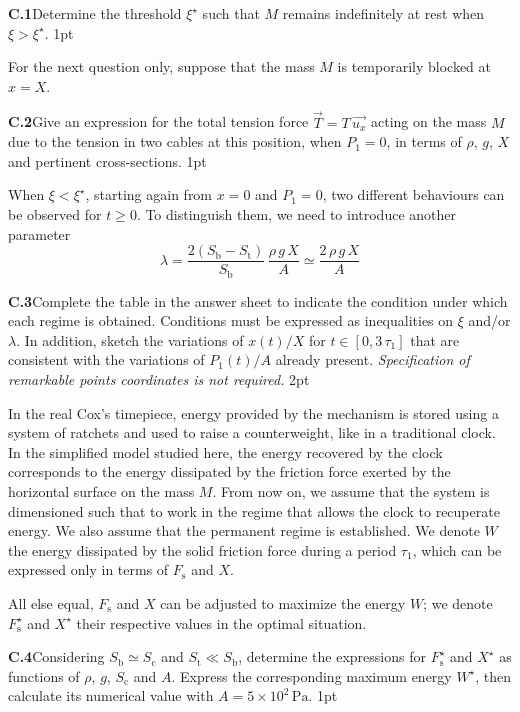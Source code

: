 \textbf{C.1}\quad Determine the threshold $\xi^\star$ such that $M$ remains
indefinitely at rest when $\xi > \xi^\star$. \hfill 1pt

For the next question only, suppose that the mass $M$ is temporarily blocked at
$x = X$.

\textbf{C.2}\quad Give an expression for the total tension force
$\overrightarrow{T} = T\,\overrightarrow{u_x}$ acting on the mass $M$ due to
the tension in two cables at this position, when $P_1 = 0$, in terms of $\rho$,
$g$, $X$ and pertinent cross-sections. \hfill 1pt

When $\xi < \xi^\star$, starting again from $x = 0$ and $P_1 = 0$, two different
behaviours can be observed for $t \geq 0$. To distinguish them, we need to
introduce another parameter
\begin{equation}
\lambda = \frac{2\left(S_\mathrm{b} - S_\mathrm{t}\right)}{S_\mathrm{b}}\,\frac{\rho\,g\,X}{A} \simeq \frac{2\,\rho\,g\,X}{A} \tag{4}
\end{equation}

\textbf{C.3}\quad Complete the table in the answer sheet to indicate the
condition under which each regime is obtained. Conditions must be expressed as
inequalities on $\xi$ and/or $\lambda$. In addition, sketch the variations of
$x(t)/X$ for $t \in \left[0, 3\,\tau_1\right]$ that are consistent with the
variations of $P_1(t)/A$ already present. \textit{Specification of remarkable
points coordinates is not required.} \hfill 2pt

In the real Cox's timepiece, energy provided by the mechanism is stored using a
system of ratchets and used to raise a counterweight, like in a traditional
clock. In the simplified model studied here, the energy recovered by the clock
corresponds to the energy dissipated by the friction force exerted by the
horizontal surface on the mass $M$. From now on, we assume that the system is
dimensioned such that to work in the regime that allows the clock to
recuperate energy. We also assume that the permanent regime is established. We
denote $W$ the energy dissipated by the solid friction force during a period
$\tau_1$, which can be expressed only in terms of $F_\mathrm{s}$ and $X$.

All else equal, $F_\mathrm{s}$ and $X$ can be adjusted to maximize the energy
$W$; we denote $F_\mathrm{s}^\star$ and $X^\star$ their respective values in
the optimal situation.

\textbf{C.4}\quad Considering $S_\mathrm{b} \simeq S_\mathrm{c}$ and
$S_\mathrm{t} \ll S_\mathrm{b}$, determine the expressions for
$F_\mathrm{s}^\star$ and $X^\star$ as functions of $\rho$, $g$, $S_\mathrm{c}$
and $A$. Express the corresponding maximum energy $W^\star$, then calculate
its numerical value with $A = 5 \times 10^2\,\mathrm{Pa}$. \hfill 1pt

